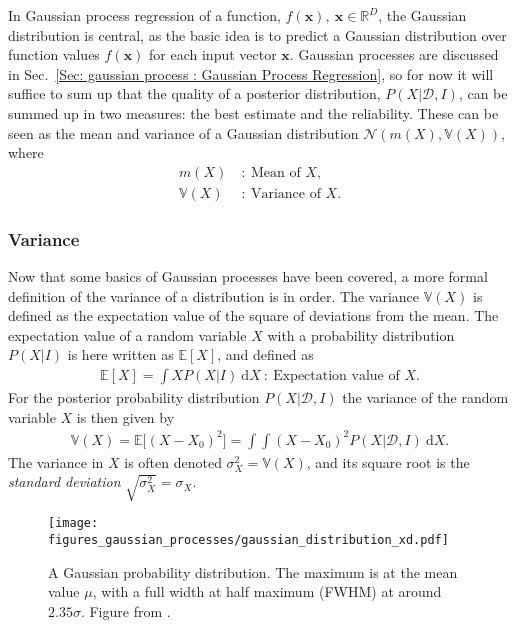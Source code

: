\documentclass[twoside,english]{uiofysmaster}
\begin{document}
In Gaussian process regression of a function, $f(\textbf{x}), ~\textbf{x} \in \mathbb{R}^D$, the Gaussian distribution is central, as the basic idea is to predict a Gaussian distribution over function values $f(\textbf{x})$ for each input vector $\textbf{x}$. Gaussian processes are discussed in Sec.~\ref{Sec: gaussian process : Gaussian Process Regression}, so for now it will suffice to sum up that the quality of a posterior distribution, $P(X| \mathcal{D}, I)$, can be summed up in two measures: the best estimate and the reliability. These can be seen as the mean and variance of a Gaussian distribution $\mathcal{N}(m(X), \mathbb{V}(X))$, where
\begin{align}
m(X)~&:~ \text{Mean of }X,\\
\mathbb{V}(X)~&:~ \text{Variance of }X.
\end{align}


\subsubsection{Variance}

Now that some basics of Gaussian processes have been covered, a more formal definition of the variance of a distribution is in order. The variance $\mathbb{V} (X)$ is defined as the expectation value of the square of deviations from the mean. The expectation value of a random variable $X$ with a probability distribution $P(X | I)$ is here written as $\mathbb{E}[X]$, and defined as
\begin{align}
\mathbb{E}[X] = \int X P(X | I) ~\text{d}X ~:~ \text{Expectation value of }X.
\end{align}
 For the posterior probability distribution $P(X| \mathcal{D}, I)$ the variance of the random variable $X$ is then given by \cite{sivia2006data}
\begin{align}\label{Eq:: gaussian process : variance X 1dim}
\mathbb{V}(X) = \mathbb{E} \big[ (X - X_0)^2 \big] = \int \int (X - X_0)^2 P (X| \mathcal{D}, I) ~\text{d}X.
\end{align}
The variance in $X$ is often denoted $\sigma_X^2 = \mathbb{V}(X)$, and its square root is the \textit{standard deviation} $\sqrt{\sigma^2_X} = \sigma_X$. 



\begin{figure}
\centering
\texttt{[image: figures\_gaussian\_processes/gaussian\_distribution\_xd.pdf]}
\caption{A Gaussian probability distribution. The maximum is at the mean value $\mu$, with a full width at half maximum (FWHM) at around $2.35 \sigma$. Figure from \cite{sivia2006data}.}
\label{Fig:: gaussian process : Gaussian distribution}
\end{figure}
\end{document}
